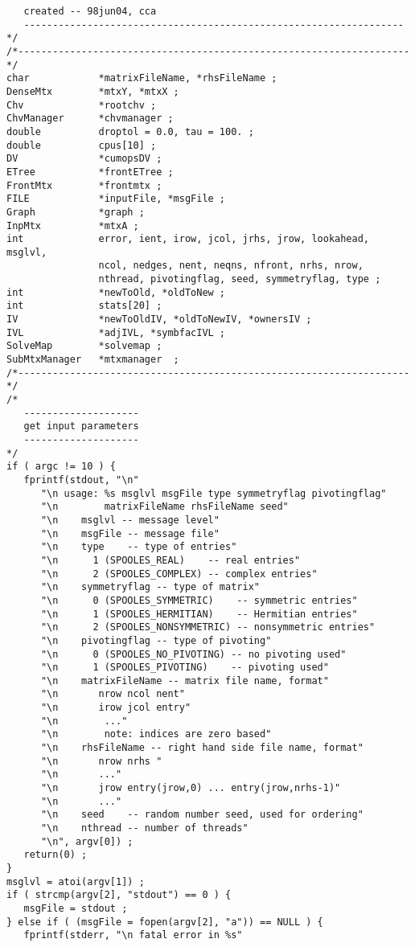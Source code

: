 \begin{verbatim}
   created -- 98jun04, cca
   ------------------------------------------------------------------
*/
/*--------------------------------------------------------------------*/
char            *matrixFileName, *rhsFileName ;
DenseMtx        *mtxY, *mtxX ;
Chv             *rootchv ;
ChvManager      *chvmanager ;
double          droptol = 0.0, tau = 100. ;
double          cpus[10] ;
DV              *cumopsDV ;
ETree           *frontETree ;
FrontMtx        *frontmtx ;
FILE            *inputFile, *msgFile ;
Graph           *graph ;
InpMtx          *mtxA ;
int             error, ient, irow, jcol, jrhs, jrow, lookahead, msglvl, 
                ncol, nedges, nent, neqns, nfront, nrhs, nrow, 
                nthread, pivotingflag, seed, symmetryflag, type ;
int             *newToOld, *oldToNew ;
int             stats[20] ;
IV              *newToOldIV, *oldToNewIV, *ownersIV ;
IVL             *adjIVL, *symbfacIVL ;
SolveMap        *solvemap ;
SubMtxManager   *mtxmanager  ;
/*--------------------------------------------------------------------*/
/*
   --------------------
   get input parameters
   --------------------
*/
if ( argc != 10 ) {
   fprintf(stdout, "\n"
      "\n usage: %s msglvl msgFile type symmetryflag pivotingflag"
      "\n        matrixFileName rhsFileName seed"
      "\n    msglvl -- message level"
      "\n    msgFile -- message file"
      "\n    type    -- type of entries"
      "\n      1 (SPOOLES_REAL)    -- real entries"
      "\n      2 (SPOOLES_COMPLEX) -- complex entries"
      "\n    symmetryflag -- type of matrix"
      "\n      0 (SPOOLES_SYMMETRIC)    -- symmetric entries"
      "\n      1 (SPOOLES_HERMITIAN)    -- Hermitian entries"
      "\n      2 (SPOOLES_NONSYMMETRIC) -- nonsymmetric entries"
      "\n    pivotingflag -- type of pivoting"
      "\n      0 (SPOOLES_NO_PIVOTING) -- no pivoting used"
      "\n      1 (SPOOLES_PIVOTING)    -- pivoting used"
      "\n    matrixFileName -- matrix file name, format"
      "\n       nrow ncol nent"
      "\n       irow jcol entry"
      "\n        ..."
      "\n        note: indices are zero based"
      "\n    rhsFileName -- right hand side file name, format"
      "\n       nrow nrhs "
      "\n       ..."
      "\n       jrow entry(jrow,0) ... entry(jrow,nrhs-1)"
      "\n       ..."
      "\n    seed    -- random number seed, used for ordering"
      "\n    nthread -- number of threads"
      "\n", argv[0]) ;
   return(0) ;
}
msglvl = atoi(argv[1]) ;
if ( strcmp(argv[2], "stdout") == 0 ) {
   msgFile = stdout ;
} else if ( (msgFile = fopen(argv[2], "a")) == NULL ) {
   fprintf(stderr, "\n fatal error in %s"

\end{verbatim}

